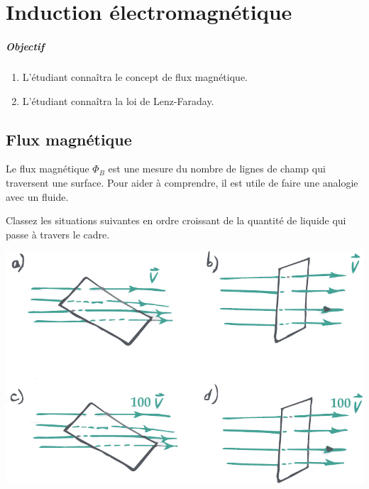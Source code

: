 \chapter{Induction électromagnétique}


\paragraph{Objectif}

\begin{enumerate}
  \item L'étudiant connaîtra le concept de flux magnétique.
  \item L'étudiant connaîtra la loi de Lenz-Faraday.
\end{enumerate}


\section{Flux magnétique}


Le flux magnétique $\Phi_B$ est une mesure du nombre de lignes de champ qui
traversent une surface. Pour aider à comprendre, il est utile de faire une
analogie avec un fluide.


\begin{diapobox}

Classez les situations suivantes en ordre croissant de la quantité de liquide
qui passe à travers le cadre.

\begin{center}
  \includegraphics[scale=0.8]{10-induction-electromagnetique/figures/flux.pdf}
\end{center}

\end{diapobox}


